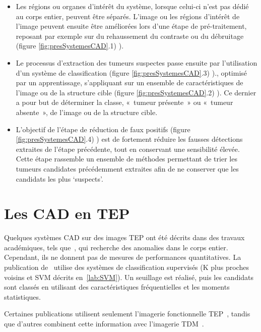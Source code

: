 \begin{itemize}
\item Les régions ou organes d’intérêt du système, lorsque celui-ci n’est pas dédié au corps entier, peuvent être séparés. L’image ou les régions d’intérêt de l’image peuvent ensuite être améliorées lors d’une étape de pré-traitement, reposant par exemple sur du rehaussement du contraste ou du débruitage (figure \ref{fig:presSystemesCAD}.1) ).
\item Le processus d’extraction des tumeurs suspectes passe ensuite par l’utilisation d’un système de classification (figure \ref{fig:presSystemesCAD}.3) )., optimisé par un apprentissage, s’appliquant sur un ensemble de caractéristiques de l’image ou de la structure cible (figure \ref{fig:presSystemesCAD}.2) ). Ce dernier a pour but de déterminer la classe, « tumeur présente » ou « tumeur absente », de l’image ou de la structure cible. 
\item L’objectif de l’étape de réduction de faux positifs (figure \ref{fig:presSystemesCAD}.4) ) est de fortement réduire les fausses détections extraites de l’étape précédente, tout en conservant une sensibilité élevée. Cette étape rassemble un ensemble de méthodes permettant de trier les tumeurs candidates précédemment extraites afin de ne conserver que les candidats les plus ‘suspects’.  
\end{itemize}

	\section{Les CAD en TEP}


Quelques systèmes CAD sur des images TEP ont été décrits dans des travaux académiques, tels que~\cite{guan2006automatic}, qui recherche des anomalies dans le corps entier. Cependant, ils ne donnent pas de mesures de performances quantitatives. La publication de~\cite{kanakatte2008pulmonary} utilise des systèmes de classification supervisés (K plus proches voisins et SVM décrits en~\ref{lab:SVM}). Un seuillage est réalisé, puis les candidats sont classés en utilisant des caractéristiques fréquentielles et les moments statistiques. 

Certaines publications utilisent seulement l'imagerie fonctionnelle TEP~\cite{ying2004novel, kanakatte2007pilot, kanakatte2008pulmonary, saradhi2009framework, el2009exploring, mhd2010artificial}, tandis que d'autres combinent cette information avec l'imagerie TDM~\cite{jafar2006computerized, nie2006integrating, potesil2007automated}.

